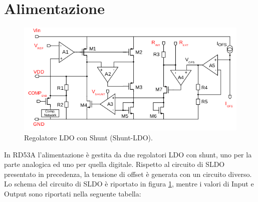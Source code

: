 \section{Alimentazione}
\begin{figure}
\centering
\includegraphics[width=\textwidth]{Immagini/SLDO_RD53A}
\caption{Regolatore LDO con Shunt (Shunt-LDO).}
\label{SLDO_RD53A}
\end{figure}
In RD53A l'alimentazione è gestita da due regolatori LDO con shunt, uno per la parte analogica ed uno per quella digitale. 
Rispetto al circuito di SLDO presentato in precedenza, la tensione di offset è generata con un circuito diverso.
Lo schema del circuito di SLDO è riportato in  figura \ref{SLDO_RD53A}, mentre i valori di Input e Output sono riportati nella seguente tabella:

